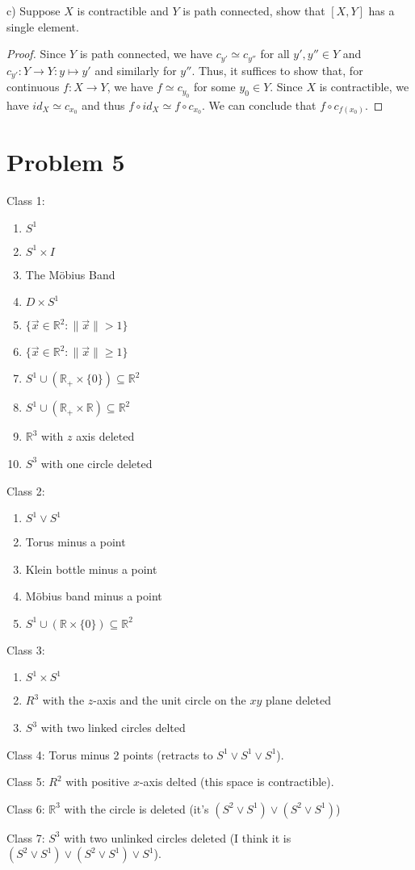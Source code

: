 \documentclass[11pt]{article} %
\newcommand{\R}{\mathbb{R}}
\begin{document}
c) Suppose $X$ is contractible and $Y$ is path connected, show that $[X,Y]$ has a single element.

\begin{proof}
Since $Y$ is path connected, we have $c_{y'}\simeq c_{y''}$ for all $y',y''\in Y$ and $c_{y'}:Y\to Y:y\mapsto y'$ and similarly for $y''$. Thus, it suffices to show that, for continuous $f:X\to Y$, we have $f\simeq c_{y_0}$ for some $y_0\in Y$. Since $X$ is contractible, we have $id_X\simeq c_{x_0}$ and thus $f\circ id_X\simeq f\circ c_{x_0}$. We can conclude that $f\circ c_{f(x_0)}$.
\end{proof}

\section*{Problem 5}
Class 1:
\begin{enumerate}
	\item $S^1$
	\item $S^1\times I$
	\item The Möbius Band
	\item $D\times S^1$
	\item $\{\vec{x}\in\R^2:\|\vec{x}\|>1\}$
	\item $\{\vec{x}\in\R^2:\|\vec{x}\|\geq1\}$
	\item $S^1\cup(\R_{+}\times\{0\})\subseteq \R^2$
	\item $S^1\cup (\R_{+}\times\R)\subseteq \R^2$
	\item $\R^3$ with $z$ axis deleted
	\item $S^3$ with one circle deleted
\end{enumerate}

Class 2:
\begin{enumerate}
	\item $S^1\vee S^1$
	\item Torus minus a point
	\item Klein bottle minus a point
	\item Möbius band minus a point
	\item $S^1\cup (\R\times\{0\})\subseteq \R^2$
\end{enumerate}

Class 3:
\begin{enumerate}
	\item $S^1\times S^1$
	\item $R^3$ with the $z$-axis and the unit circle on the $xy$ plane deleted
	\item $S^3$ with two linked circles delted
\end{enumerate}

Class 4: Torus minus 2 points (retracts to $S^1\vee S^1\vee S^1$).

Class 5: $R^2$ with positive $x$-axis delted (this space is contractible).

Class 6: $\R^3$ with the circle is deleted (it's $(S^2\vee S^1)\vee (S^2\vee S^1)$)

Class 7: $S^3$ with two unlinked circles deleted (I think it is $(S^2\vee S^1)\vee (S^2\vee S^1)\vee S^1$).
\end{document}
